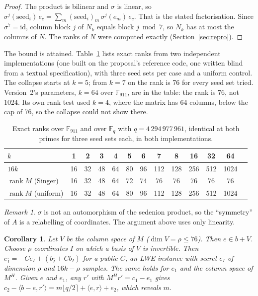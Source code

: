 \documentclass[11pt]{article}
\newtheorem{corollary}{Corollary}
\theoremstyle{remark}
\newtheorem{remark}{Remark}
\newcommand{\F}{\mathbb{F}}
\DeclareMathOperator{\rank}{rank}
\begin{document}
\begin{proof}
The product is bilinear and $\sigma$ is linear, so $\sigma^{j}(\mathrm{seed}_i)\,e_c=\sum_m(\mathrm{seed}_i)_m\,
\sigma^{j}(e_m)\,e_c$. That is the stated factorisation. Since $\sigma^7=\mathrm{id}$, column block $j$ of $N_k$ equals
block $j\bmod7$, so $N_k$ has at most the columns of $N$. The ranks of $N$ were computed exactly (Section~\ref{sec:repro}).
\end{proof}

The bound is attained. Table~\ref{tab:rank} lists exact ranks from two independent implementations (one built on the
proposal's reference code, one written blind from a textual specification), with three seed sets per case and a
uniform control. The collapse starts at $k=5$; from $k=7$ on the rank is 76 for every seed set tried. Version~2's
parameters, $k=64$ over $\F_{911}$, are in the table: the rank is 76, not 1024. Its own rank test used $k=4$, where the
matrix has 64 columns, below the cap of 76, so the collapse could not show there.

\begin{table}[h]\centering\small
\begin{tabular}{lcccccccccccc}\toprule
$k$ & 1&2&3&4&5&6&7&8&16&32&64\\\midrule
$16k$ & 16&32&48&64&80&96&112&128&256&512&1024\\
$\rank M$ (Singer) & 16&32&48&64&72&74&76&76&76&76&76\\
$\rank M$ (uniform) & 16&32&48&64&80&96&112&128&256&512&1024\\\bottomrule
\end{tabular}
\caption{Exact ranks over $\F_{911}$ and over $\F_q$ with $q=4\,294\,977\,961$, identical at both primes for three seed
sets each, in both implementations.}\label{tab:rank}
\end{table}

\begin{remark}
$\sigma$ is not an automorphism of the sedenion product, so the ``symmetry'' of $A$ is a relabelling of coordinates. The
argument above uses only linearity.
\end{remark}

\begin{corollary}
Let $V$ be the column space of $M$ ($\dim V=\rho\le76$). Then $e\in b+V$. Choose $\rho$ coordinates $I$ on which a basis
of $V$ is invertible. Then $e_{\bar I}=-C e_I+(b_{\bar I}+C b_I)$ for a public $C$, an LWE instance with secret $e_I$ of
dimension $\rho$ and $16k-\rho$ samples. The same holds for $e_1$ and the column space of $M^{H}$. Given $e$ and $e_1$, any
$r'$ with $M^{H}r'=c_1-e_1$ gives $c_2-\langle b-e,r'\rangle=m\lfloor q/2\rceil+\langle e,r\rangle+e_2$, which reveals $m$.
\end{corollary}
\end{document}
